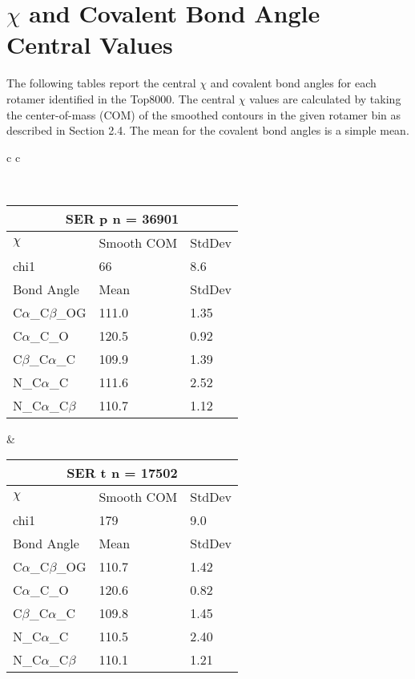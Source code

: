 \section*{$\chi$ and Covalent Bond Angle Central Values}
The following tables report the central $\chi$ and covalent bond angles for each rotamer identified in the Top8000. The central $\chi$ values are calculated by taking the center-of-mass (COM) of the smoothed contours in the given rotamer bin as described in Section 2.4. The mean for the covalent bond angles is a simple mean.


\begin{longtable}{ c c }

\caption{SER Central Values}\\
  \begin{tabular}{ l l l }
  \toprule
  \multicolumn{3}{c}{SER \textbf{p} n = 36901} \\ \toprule
  $\chi$       & Smooth COM & StdDev \\ \midrule
  chi1 & 66 & 8.6 \\ \midrule
  Bond Angle   & Mean     & StdDev \\ \midrule
  C$\alpha$\_C$\beta$\_OG & 111.0 & 1.35\\
  C$\alpha$\_C\_O & 120.5 & 0.92\\
  C$\beta$\_C$\alpha$\_C & 109.9 & 1.39\\
  N\_C$\alpha$\_C & 111.6 & 2.52\\
  N\_C$\alpha$\_C$\beta$ & 110.7 & 1.12\\
  \bottomrule
  \end{tabular}
  &
  \begin{tabular}{ l l l }
  \toprule
  \multicolumn{3}{c}{SER \textbf{t} n = 17502} \\ \toprule
  $\chi$       & Smooth COM & StdDev \\ \midrule
  chi1 & 179 & 9.0 \\ \midrule
  Bond Angle   & Mean     & StdDev \\ \midrule
  C$\alpha$\_C$\beta$\_OG & 110.7 & 1.42\\
  C$\alpha$\_C\_O & 120.6 & 0.82\\
  C$\beta$\_C$\alpha$\_C & 109.8 & 1.45\\
  N\_C$\alpha$\_C & 110.5 & 2.40\\
  N\_C$\alpha$\_C$\beta$ & 110.1 & 1.21\\
  \bottomrule
  \end{tabular}
  \\
  \begin{tabular}{ l l l }

\end{tabular}
\end{longtable}
